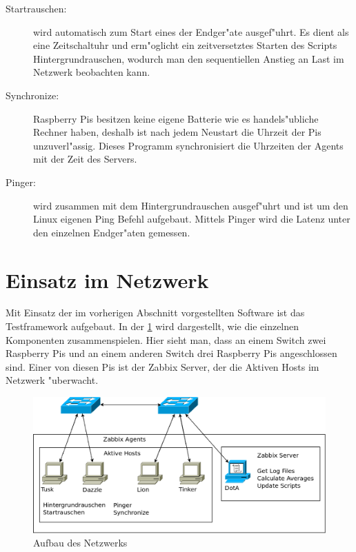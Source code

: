 \begin{enumerate}
\begin{description}
\item[Startrauschen:]wird automatisch zum Start eines der Endger"ate ausgef"uhrt. Es dient als eine Zeitschaltuhr %
und erm"oglicht ein zeitversetztes Starten des Scripts Hintergrundrauschen, wodurch man den sequentiellen %
Anstieg an Last im Netzwerk beobachten kann.

\item[Synchronize:]Raspberry Pis besitzen keine eigene Batterie wie es handels"ubliche Rechner haben, %
deshalb ist nach jedem Neustart die Uhrzeit der Pis unzuverl"assig. Dieses Programm synchronisiert %
die Uhrzeiten der Agents mit der Zeit des Servers. %

\item[Pinger:]wird zusammen mit dem Hintergrundrauschen ausgef"uhrt und ist um den Linux eigenen Ping Befehl %
aufgebaut. Mittels Pinger wird die Latenz unter den einzelnen Endger"aten gemessen. %
\end{description}
\end{enumerate}
\section{Einsatz im Netzwerk} 

Mit Einsatz der im vorherigen Abschnitt vorgestellten Software ist das Testframework aufgebaut. In der \cref{fig:AufbauVomNetzwerk} %
wird dargestellt, wie die einzelnen Komponenten zusammenspielen. Hier sieht man, dass an einem Switch zwei Raspberry Pis %
und an einem anderen Switch drei Raspberry Pis angeschlossen sind. Einer von diesen Pis ist der Zabbix Server, der %
die Aktiven Hosts im Netzwerk "uberwacht. 

\label{sec:einsatzImNetzwerk}
\begin{figure}[htbp]
\centering
\includegraphics*[width=0.9\linewidth]{Abb/Netzschaltung3}

\caption{Aufbau des Netzwerks}
\label{fig:AufbauVomNetzwerk}
\end{figure}














